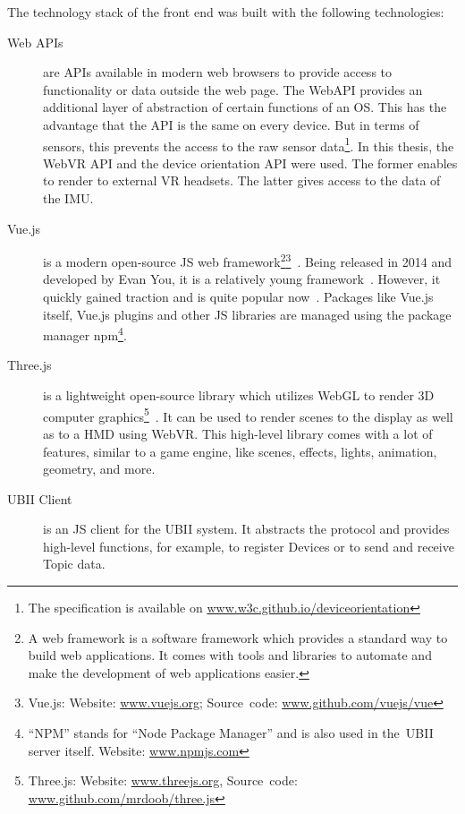 The technology stack of the front end was built with the following technologies:
\begin{description}
	\item[Web APIs] are \acfp{API} available in modern web browsers to provide access to functionality or data outside the web page. The WebAPI provides an additional layer of abstraction of certain functions of an \ac{OS}. This has the advantage that the API is the same on every device. But in terms of sensors, this prevents the access to the raw sensor data\footnote{The specification is available on \href{https://w3c.github.io/deviceorientation/}{www.w3c.github.io/deviceorientation}}. In this thesis, the WebVR \ac{API} and the device orientation \ac{API} were used. The former enables to render to external \ac{VR} headsets. The latter gives access to the data of the \acf{IMU}.
	 
	\item[Vue.js] is a modern open-source \acl{JS} web framework\footnote{A web framework is a software framework which provides a standard way to build web applications. It comes with tools and libraries to automate and make the development of web applications easier.}\footnote{Vue.js: Website: \href{https://vuejs.org/}{www.vuejs.org}; Source~code: \href{https://github.com/vuejs/vue}{www.github.com/vuejs/vue}}~\cite{You.2019}. Being released in 2014 and developed by Evan You, it is a relatively young framework~\cite[17]{Koetsier.2016}. However, it quickly gained traction and is quite popular now~\cite[12\psq]{Koetsier.2016}.
  Packages like Vue.js itself, Vue.js plugins and other \acl{JS} libraries are managed using the package manager npm\footnote{\enquote{NPM} stands for \enquote{Node Package Manager} and is also used in the~\ac{UBII} server itself. Website: \href{https://www.npmjs.com/}{www.npmjs.com}}.
  
	\item[Three.js] is a lightweight open-source library which utilizes WebGL to render \ac{3D} computer graphics\footnote{Three.js: Website: \href{https://threejs.org/}{www.threejs.org}, Source~code: \href{https://github.com/mrdoob/three.js/}{www.github.com/mrdoob/three.js}}~\cite{Cabello.2019}. It can be used to render scenes to the display as well as to a \ac{HMD} using WebVR. This high-level library comes with a lot of features, similar to a game engine, like scenes, effects, lights, animation, geometry, and more.
	 
	\item[UBII Client] is an \acl{JS} client for the \ac{UBII} system. It abstracts the protocol and provides high-level functions, for example, to register Devices or to send and receive Topic data.
\end{description}

